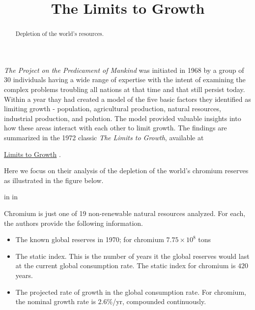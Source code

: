 \documentclass{ximera}
\title{The Limits to Growth}
\newcommand{\pskip}{\vskip 0.1 in}
\begin{document}
\begin{abstract}
Depletion of the world's resources.
\end{abstract}
\maketitle


\emph{The Project on the Predicament of Mankind} was initiated in 1968 by a group of 30 individuals having a wide range of expertise with the intent of examining the complex problems troubling all nations at that time and that still persist today. Within a year thay had created a model of the five basic factors they identified as limiting growth  - population, agricultural production, natural resources, industrial production, and polution. The model  provided valuable insights into how these areas interact with each other to limit growth. The findings are summarized in the 1972 classic \emph{The Limits to Growth}, available at

\href{https://www.library.dartmouth.edu/digital/digital-collections/limits-growth}{Limits to Growth} .

Here we focus on their analysis of the depletion of the world's chromium reserves as illustrated in the figure below. %

 
\begin{onlineOnly}
    \begin{center}
\end{center}
\end{onlineOnly}




\pskip \pskip

Chromium is just one of 19 non-renewable natural resources analyzed. For each, the authors provide the following information.

\begin{itemize}
\item{The known global reserves in 1970; for chromium $7.75\times 10^8$ tons}

\item{The static index. This is the number of years it the global reserves would last at the current global consumption rate. The static index for chromium is $420$ years.}

\item{The projected rate of growth in the global consumption rate. For chromium, the nominal growth rate is $2.6\%$/yr, compounded continuously.}

\end{itemize}
\end{document}

